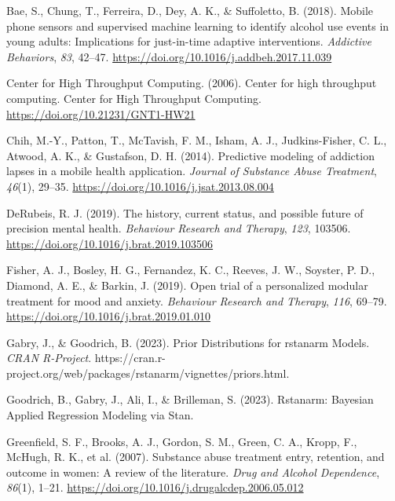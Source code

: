 \documentclass[
]{agujournal2019}
\newlength{\cslhangindent}
\newenvironment{CSLReferences}[2] %
 {\begin{list}{}{%
  \setlength{\itemindent}{0pt}
  \setlength{\leftmargin}{0pt}
  \setlength{\parsep}{0pt}
  \ifodd #1
   \setlength{\leftmargin}{\cslhangindent}
   \setlength{\itemindent}{-1\cslhangindent}
  \fi
  \setlength{\itemsep}{#2\baselineskip}}}
 {\end{list}}
\begin{document}
\label{refs}
\begin{CSLReferences}{1}{0}
\vspace{1em}

Bae, S., Chung, T., Ferreira, D., Dey, A. K., \& Suffoletto, B. (2018).
Mobile phone sensors and supervised machine learning to identify alcohol
use events in young adults: {Implications} for just-in-time adaptive
interventions. \emph{Addictive Behaviors}, \emph{83}, 42--47.
\url{https://doi.org/10.1016/j.addbeh.2017.11.039}

Center for High Throughput Computing. (2006). Center for high throughput
computing. Center for High Throughput Computing.
\url{https://doi.org/10.21231/GNT1-HW21}

Chih, M.-Y., Patton, T., McTavish, F. M., Isham, A. J., Judkins-Fisher,
C. L., Atwood, A. K., \& Gustafson, D. H. (2014). Predictive modeling of
addiction lapses in a mobile health application. \emph{Journal of
Substance Abuse Treatment}, \emph{46}(1), 29--35.
\url{https://doi.org/10.1016/j.jsat.2013.08.004}

DeRubeis, R. J. (2019). The history, current status, and possible future
of precision mental health. \emph{Behaviour Research and Therapy},
\emph{123}, 103506. \url{https://doi.org/10.1016/j.brat.2019.103506}

Fisher, A. J., Bosley, H. G., Fernandez, K. C., Reeves, J. W., Soyster,
P. D., Diamond, A. E., \& Barkin, J. (2019). Open trial of a
personalized modular treatment for mood and anxiety. \emph{Behaviour
Research and Therapy}, \emph{116}, 69--79.
\url{https://doi.org/10.1016/j.brat.2019.01.010}

Gabry, J., \& Goodrich, B. (2023). Prior {Distributions} for rstanarm
{Models}. \emph{CRAN R-Project}.
https://cran.r-project.org/web/packages/rstanarm/vignettes/priors.html.

Goodrich, B., Gabry, J., Ali, I., \& Brilleman, S. (2023). Rstanarm:
{Bayesian Applied Regression Modeling} via {Stan}.

Greenfield, S. F., Brooks, A. J., Gordon, S. M., Green, C. A., Kropp,
F., McHugh, R. K., et al. (2007). Substance abuse treatment entry,
retention, and outcome in women: {A} review of the literature.
\emph{Drug and Alcohol Dependence}, \emph{86}(1), 1--21.
\url{https://doi.org/10.1016/j.drugalcdep.2006.05.012}


\end{CSLReferences}
\end{document}

